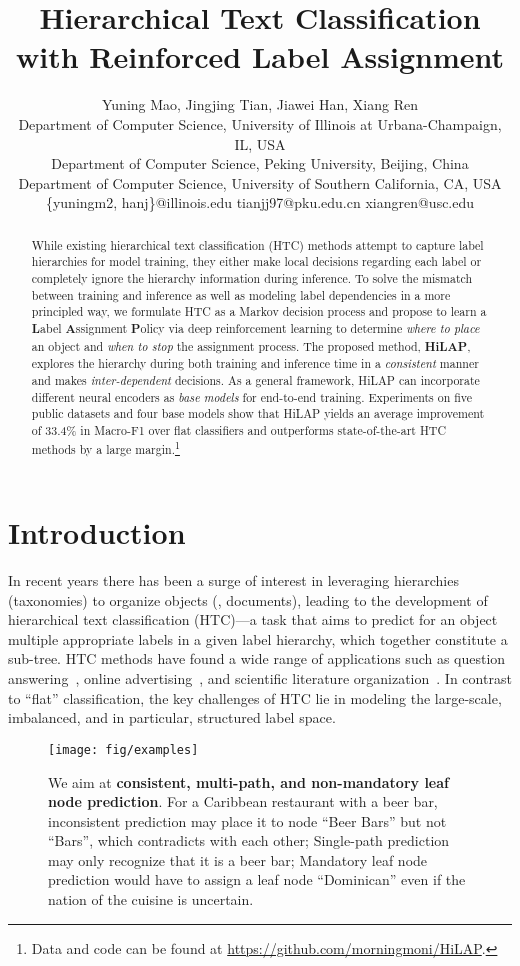 \documentclass[11pt,a4paper]{article}
\title{Hierarchical Text Classification with Reinforced Label Assignment}
\author{Yuning Mao, Jingjing Tian, Jiawei Han, Xiang Ren \\
Department of Computer Science, University of Illinois at Urbana-Champaign, IL, USA \\
Department of Computer Science, Peking University, Beijing, China\\
Department of Computer Science, University of Southern California, CA, USA\\
\{yuningm2, hanj\}@illinois.edu 
  tianjj97@pku.edu.cn  xiangren@usc.edu
}
\date{}
\begin{document}
\maketitle
\begin{abstract}
While existing hierarchical text classification (HTC) methods attempt to capture label hierarchies for model training, they either make local decisions regarding each label or completely ignore the hierarchy information during inference. 
To solve the mismatch between training and inference as well as modeling label dependencies in a more principled way, 
we formulate HTC as a Markov decision process and propose to learn a \textbf{L}abel \textbf{A}ssignment \textbf{P}olicy via deep reinforcement learning to determine \textit{where to place} an object and \textit{when to stop} the assignment process. 
The proposed method, \textbf{HiLAP}, explores the hierarchy during both training and inference time in a \textit{consistent} manner and makes \textit{inter-dependent} decisions.
As a general framework, HiLAP can incorporate different neural encoders as \textit{base models} for end-to-end training.
Experiments on five public datasets and four base models show that HiLAP yields an average improvement of 33.4\% in Macro-F1 over flat classifiers and outperforms state-of-the-art HTC methods by a large margin.\footnote{\scriptsize Data and code can be found at \url{https://github.com/morningmoni/HiLAP}.}
\end{abstract}


\section{Introduction}

In recent years there has been a surge of interest in leveraging hierarchies (taxonomies) to organize objects (\eg, documents), leading to the development of hierarchical text classification (HTC)---a task that aims to predict for an object multiple appropriate labels in a given label hierarchy, which together constitute a sub-tree. HTC methods have found a wide range of applications such as question answering~\citep{Qu2012AnEO}, online advertising~\citep{agrawal2013multi}, and scientific literature organization~\citep{peng2016deepmesh}.
In contrast to ``flat'' classification, the key challenges of HTC lie in modeling the large-scale, imbalanced, and in particular, structured label space.

\begin{figure}[t]
    \centering
    \texttt{[image: fig/examples]}
     \caption{We aim at \textbf{consistent, multi-path, and non-mandatory leaf node prediction}. For a Caribbean restaurant with a beer bar, inconsistent prediction may place it to node ``Beer Bars'' but not ``Bars'', which contradicts with each other; Single-path prediction may only recognize that it is a beer bar; Mandatory leaf node prediction would have to assign a leaf node ``Dominican'' even if the nation of the cuisine is uncertain.}
    \label{fig:examples}
    \vspace*{-.1cm}
\end{figure}
\end{document}
